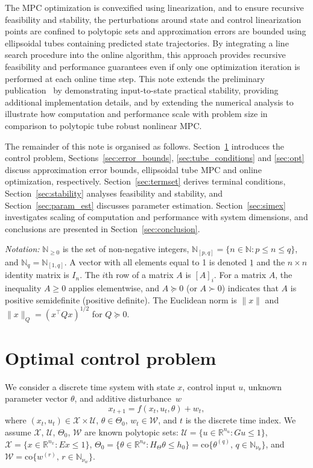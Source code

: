 \documentclass{IEEEtran}
\theoremstyle{definition}
\theoremstyle{remark}
\begin{document}
The MPC optimization is convexified using linearization, and to ensure recursive feasibility and stability, the perturbations around state and control linearization points are confined to polytopic sets and approximation errors are bounded using ellipsoidal tubes containing predicted state trajectories. 
%
By integrating a line search procedure into the online algorithm, this approach provides recursive feasibility and performance guarantees even if only one optimization iteration is performed at each online time step.
%
This note extends the preliminary publication~\cite{Buerger25} by demonstrating input-to-state practical stability, providing additional implementation details, and by extending the numerical analysis to illustrate how computation and performance scale with problem size in comparison to polytopic tube robust nonlinear MPC.

The remainder of this note is organised as follows. Section~\ref{sec:problem_statement} introduces the control problem, 
Sections~\ref{sec:error_bounds}, \ref{sec:tube_conditions} and \ref{sec:opt} discuss approximation error bounds, ellipsoidal tube MPC and online optimization, respectively. Section~\ref{sec:termset} derives terminal conditions, Section~\ref{sec:stability} analyses feasibility and stability, and Section~\ref{sec:param_est} discusses parameter estimation.
%
Section~\ref{sec:simex} investigates scaling of computation and performance with system dimensions, and conclusions are presented in Section~\ref{sec:conclusion}.

\textit{Notation:} $\mathbb{N}_{\geq 0}$ is the set of non-negative integers, $\mathbb{N}_{[p,q]} = \{n\in\mathbb{N} : {p \leq n \leq q}\}$, and $\mathbb{N}_q =  \mathbb{N}_{[1,q]}$.
%
A vector with all elements equal to 1 is denoted $\underline{1}$ and the $n\times n$ identity matrix is $I_n$.
%
The $i$th row of a matrix $A$ is $[A]_i$.
%
For a matrix $A$, the inequality $A \geq 0$ applies elementwise, and $A \succeq 0$ (or $A \succ 0$) indicates that $A$ is positive semidefinite (positive definite).  
The Euclidean norm is $\|x\|$ and $\|x\|_Q = (x^\top Q x)^{1/2}$ for $Q\succeq 0$.  

\section{Optimal control problem}\label{sec:problem_statement}

We consider a discrete time system with state $x$, control input $u$, unknown parameter vector $\theta$, and additive disturbance~$w$
\begin{equation}\label{eq:system}
x_{t+1} = f(x_t,u_t,\theta) + w_t ,
\end{equation}
where $(x_t,u_t) \in \mathcal{X}\times\mathcal{U}$, $\theta \in \Theta_0$, $w_t\in \mathcal{W}$, and $t$ is the discrete time index.
We assume $\mathcal{X}$, $\mathcal{U}$, $\Theta_0$, $\mathcal{W}$ are known polytopic sets:
$\mathcal{U} = \{u \in \mathbb{R}^{n_u} : G u \leq 1\}$,
$\mathcal{X} = \{x \in \mathbb{R}^{n_x}  : E x \leq 1\}$,
$\Theta_0 = \{\theta \in \mathbb{R}^{n_{\theta}} : H_{\Theta} \theta \leq h_0\}=\mathrm{co}\{\theta^{(q)},\, q \in\mathbb{N}_{\nu_{\theta}}\}$, and $\mathcal{W}=\mathrm{co}\{w^{(r)}, \, r \in\mathbb{N}_{\nu_{w}}\}$.
\end{document}

